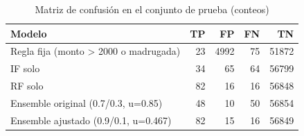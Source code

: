 \begin{table}[H]
\centering
\small
\begin{tabular}{lrrrr}
\hline
Modelo & TP & FP & FN & TN \\
\hline
Regla fija (monto > 2000 o madrugada) & 23 & 4992 & 75 & 51872 \\
IF solo & 34 & 65 & 64 & 56799 \\
RF solo & 82 & 16 & 16 & 56848 \\
Ensemble original (0.7/0.3, u=0.85) & 48 & 10 & 50 & 56854 \\
Ensemble ajustado (0.9/0.1, u=0.467) & 82 & 15 & 16 & 56849 \\
\hline
\end{tabular}
\caption{Matriz de confusión en el conjunto de prueba (conteos)}
\label{tab:confusion}
\end{table}
